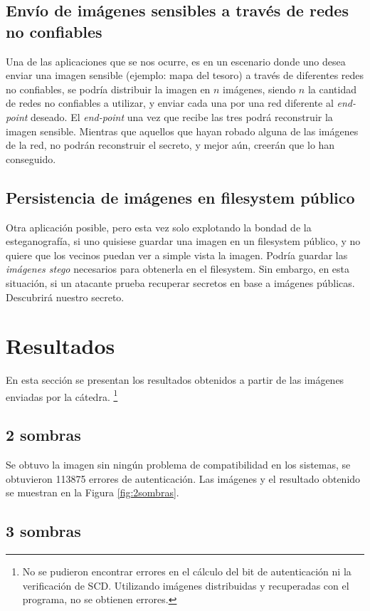 \documentclass{article}
\begin{document}
\subsection{Envío de imágenes sensibles a través de redes no confiables}
Una de las aplicaciones que se nos ocurre, es en un escenario donde uno desea enviar una imagen sensible (ejemplo: mapa del tesoro)
a través de diferentes redes no confiables, se podría distribuir la imagen en $n$ imágenes, siendo $n$ la cantidad de redes no confiables
a utilizar, y enviar cada una por una red diferente al \emph{end-point} deseado. El \emph{end-point} una vez que recibe las tres podrá
reconstruir la imagen sensible. Mientras que aquellos que hayan robado alguna de las imágenes de la red, no podrán reconstruir el secreto,
y mejor aún, creerán que lo han conseguido.

\subsection{Persistencia de imágenes en filesystem público}
Otra aplicación posible, pero esta vez solo explotando la bondad de la esteganografía, si uno quisiese guardar una imagen en un filesystem
público, y no quiere que los vecinos puedan ver a simple vista la imagen. Podría guardar las \emph{imágenes stego} necesarios para obtenerla en el filesystem.
Sin embargo, en esta situación, si un atacante prueba recuperar secretos en base a imágenes públicas. Descubrirá nuestro secreto.

\section{Resultados}

En esta sección se presentan los resultados obtenidos a partir de las imágenes enviadas por la cátedra.
\footnote{No se pudieron encontrar errores en el cálculo del bit de autenticación ni la verificación de SCD. Utilizando
imágenes distribuidas y recuperadas con el programa, no se obtienen errores.}

\subsection{2 sombras}

Se obtuvo la imagen sin ningún problema de compatibilidad en los sistemas, se obtuvieron 113875 errores de autenticación.
Las imágenes y el resultado obtenido se muestran en la Figura \ref{fig:2sombras}.

\subsection{3 sombras}
\end{document}

